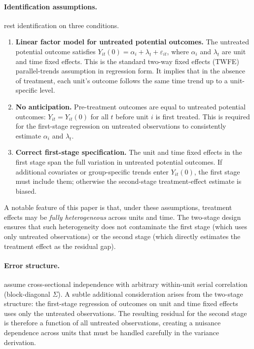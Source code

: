 \documentclass[12pt]{article}
\begin{document}
\paragraph{Identification assumptions.}
\citet{gardner2024twostage} rest identification on three conditions.
\begin{enumerate}
  \item \textbf{Linear factor model for untreated potential outcomes.}
        The untreated potential outcome satisfies
        $Y_{it}(0) = \alpha_i + \lambda_t + \varepsilon_{it}$,
        where $\alpha_i$ and $\lambda_t$ are unit and time fixed effects.
        This is the standard two-way fixed effects (TWFE) parallel-trends
        assumption in regression form.
        It implies that in the absence of treatment, each unit's outcome
        follows the same time trend up to a unit-specific level.

  \item \textbf{No anticipation.}
        Pre-treatment outcomes are equal to untreated potential outcomes:
        $Y_{it} = Y_{it}(0)$ for all $t$ before unit $i$ is first treated.
        This is required for the first-stage regression on untreated
        observations to consistently estimate $\alpha_i$ and $\lambda_t$.

  \item \textbf{Correct first-stage specification.}
        The unit and time fixed effects in the first stage span the full
        variation in untreated potential outcomes.
        If additional covariates or group-specific trends enter
        $Y_{it}(0)$, the first stage must include them; otherwise the
        second-stage treatment-effect estimate is biased.
\end{enumerate}
A notable feature of this paper is that, under these assumptions,
treatment effects may be \textit{fully heterogeneous} across units and time.
The two-stage design ensures that such heterogeneity does not contaminate the
first stage (which uses only untreated observations) or the second stage
(which directly estimates the treatment effect as the residual gap).

\paragraph{Error structure.}
\citet{gardner2024twostage} assume cross-sectional independence with arbitrary
within-unit serial correlation (block-diagonal $\Sigma$).
A subtle additional consideration arises from the two-stage structure: the
first-stage regression of outcomes on unit and time fixed effects uses only
the untreated observations.
The resulting residual for the second stage is therefore a function of all
untreated observations, creating a nuisance dependence across units that must
be handled carefully in the variance derivation.
\end{document}
